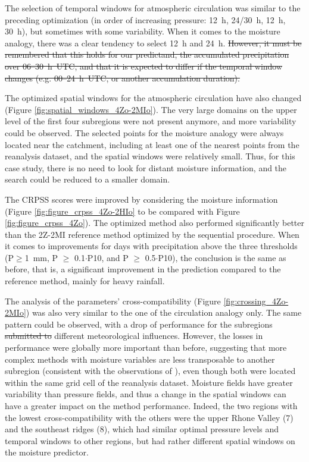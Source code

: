 \documentclass[review]{elsarticle}
\providecommand{\DIFaddtex}[1]{{\protect\color{blue}\uwave{#1}}} %
\providecommand{\DIFdeltex}[1]{{\protect\color{red}\sout{#1}}}                      %
\providecommand{\DIFaddbegin}{} %
\providecommand{\DIFaddend}{} %
\providecommand{\DIFdelbegin}{} %
\providecommand{\DIFdelend}{} %
\providecommand{\DIFadd}[1]{\texorpdfstring{\DIFaddtex{#1}}{#1}} %
\providecommand{\DIFdel}[1]{\texorpdfstring{\DIFdeltex{#1}}{}} %
\begin{document}
The selection of temporal windows for atmospheric circulation was similar to the preceding optimization (in order of increasing pressure: 12~h, 24/30~h, 12~h, 30~h), but sometimes with some variability. When it comes to the moisture analogy, there was a clear tendency to select 12~h and 24~h.
\DIFdelbegin \DIFdel{However, it must be remembered that this holds for our predictand, the accumulated precipitation over 06--30~h~UTC, and that it is expected to differ if the temporal window changes (e.g. 00--24~h~UTC, or another accumulation duration).
}\DIFdelend 

The optimized spatial windows for the atmospheric circulation have also changed (Figure \ref{fig:spatial_windows_4Zo-2MIo}). The very large domains on the upper level of the first four subregions were not present anymore, and more variability could be observed. The selected points for the moisture analogy were always located near the catchment, including at least one of the nearest points from the reanalysis dataset, and the spatial windows were relatively small. Thus, for this case study, there is no need to look for distant moisture information, and the search could be reduced to a smaller domain. 

The CRPSS scores were improved by considering the moisture information (Figure \ref{fig:figure_crpss_4Zo-2HIo} to be compared with Figure \ref{fig:figure_crpss_4Zo}). The optimized method also performed significantly better than the 2Z-2MI reference method optimized by the sequential procedure. When it comes to improvements for days with precipitation above the three thresholds (P\(\geq\)1~mm, P \(\geq\) 0.1\(\cdot\)P10, and P \(\geq\) 0.5\(\cdot\)P10), the conclusion is the same as before, that is, a significant improvement in the prediction compared to the reference method, mainly for heavy rainfall.

The analysis of the parameters’ cross-compatibility (Figure \ref{fig:crossing_4Zo-2MIo}) was also very similar to the one of the circulation analogy only. The same pattern could be observed, with a drop of performance for the subregions \DIFdelbegin \DIFdel{submitted to }\DIFdelend \DIFaddbegin \DIFadd{characterized by }\DIFaddend different meteorological influences. However, the losses in performance were globally more important than before, suggesting that more complex methods with moisture variables are less transposable to another subregion (consistent with the observations of \citet{Chardon2014}), even though both were located within the same grid cell of the reanalysis dataset. Moisture fields have greater variability than pressure fields, and thus a change in the spatial windows can have a greater impact on the method performance. Indeed, the two regions with the lowest cross-compatibility with the others were the upper Rhone Valley (7) and the southeast ridges (8), which had similar optimal pressure levels and temporal windows to other regions, but had rather different spatial windows on the moisture predictor.
\end{document}
